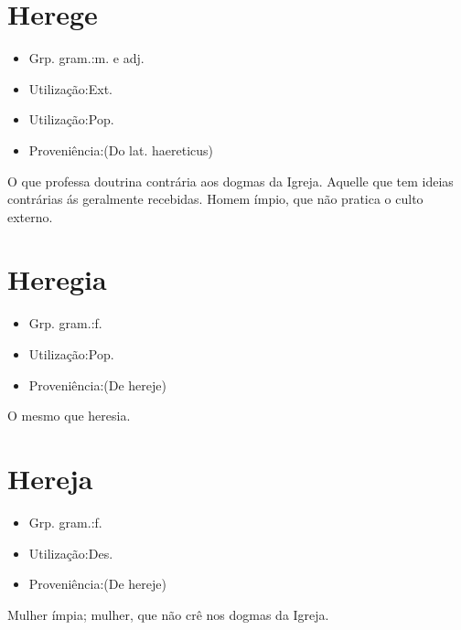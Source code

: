 \documentclass{article}
\begin{document}
\section{Herege}
\begin{itemize}
\item {Grp. gram.:m.  e  adj.}
\end{itemize}
\begin{itemize}
\item {Utilização:Ext.}
\end{itemize}
\begin{itemize}
\item {Utilização:Pop.}
\end{itemize}
\begin{itemize}
\item {Proveniência:(Do lat. \textunderscore haereticus\textunderscore )}
\end{itemize}
O que professa doutrina contrária aos dogmas da Igreja.
Aquelle que tem ideias contrárias ás geralmente recebidas.
Homem ímpio, que não pratica o culto externo.
\section{Heregia}
\begin{itemize}
\item {Grp. gram.:f.}
\end{itemize}
\begin{itemize}
\item {Utilização:Pop.}
\end{itemize}
\begin{itemize}
\item {Proveniência:(De \textunderscore hereje\textunderscore )}
\end{itemize}
O mesmo que \textunderscore heresia\textunderscore .
\section{Hereja}
\begin{itemize}
\item {Grp. gram.:f.}
\end{itemize}
\begin{itemize}
\item {Utilização:Des.}
\end{itemize}
\begin{itemize}
\item {Proveniência:(De \textunderscore hereje\textunderscore )}
\end{itemize}
Mulher ímpia; mulher, que não crê nos dogmas da Igreja.
\end{document}
